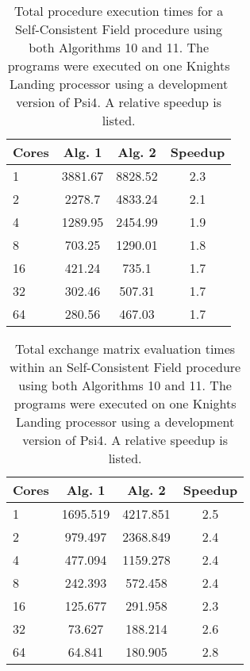 \begingroup
\begin{table}[H]
\centering
\renewcommand{\baselinestretch}{1}
\caption{Total procedure execution times for a Self-Consistent Field procedure using both Algorithms 10 and 11. The programs were executed on one Knights Landing processor
    using a development version of {\sc Psi4}. A relative speedup is listed.}
\begin{tabular}{l ccc}
\multicolumn{1}{l}{\textbf{Cores}} &
\multicolumn{1}{c}{\textbf{Alg. 1}} &
\multicolumn{1}{c}{\textbf{Alg. 2}} &
\multicolumn{1}{c}{\textbf{Speedup}} \\
\hline

1   &3881.67&   8828.52 &2.3 \\
2   &2278.7 &   4833.24 &2.1 \\
4   &1289.95&   2454.99 &1.9 \\
8   &703.25&    1290.01 &1.8 \\
16  &421.24&    735.1   &1.7 \\
32  &302.46&    507.31  &1.7 \\
64  &280.56&    467.03  &1.7 \\

\end{tabular}
\end{table}
\endgroup


\begingroup
\begin{table}[H]
\centering
\renewcommand{\baselinestretch}{1}
\caption{Total exchange matrix evaluation times within an Self-Consistent Field procedure using both Algorithms 10 and 11. The programs were executed on one Knights Landing processor
    using a development version of {\sc Psi4}. A relative speedup is listed.}
\begin{tabular}{l ccc}
\multicolumn{1}{l}{\textbf{Cores}} &
\multicolumn{1}{c}{\textbf{Alg. 1}} &
\multicolumn{1}{c}{\textbf{Alg. 2}} &
\multicolumn{1}{c}{\textbf{Speedup}} \\
\hline

1   &1695.519&  4217.851&   2.5\\
2   & 979.497&  2368.849&   2.4\\
4   & 477.094&  1159.278&   2.4\\
8   & 242.393&   572.458&   2.4\\
16  & 125.677&   291.958&   2.3\\
32  &  73.627&   188.214&   2.6\\
64  &  64.841&   180.905&   2.8\\

\end{tabular}
\end{table}
\endgroup 




